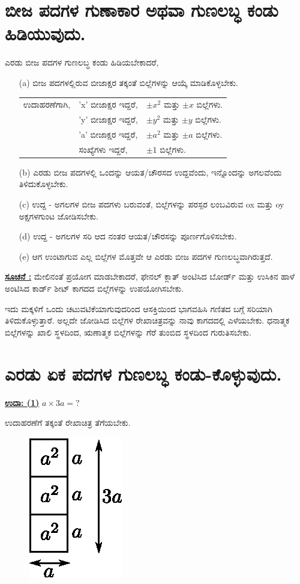 \section*{ಬೀಜ ಪದಗಳ ಗುಣಾಕಾರ ಅಥವಾ ಗುಣಲಬ್ಧ ಕಂಡು ಹಿಡಿಯುವುದು.}

ಎರಡು ಬೀಜ ಪದಗಳ ಗುಣಲಬ್ಧ ಕಂಡು ಹಿಡಿಯಬೇಕಾದರೆ,
\begin{itemize}
\item [(a)] ಬೀಜ ಪದಗಳಲ್ಲಿರುವ ಬೀಜಾಕ್ಷರ ತಕ್ಕಂತೆ ಬಿಲ್ಲೆಗಳನ್ನು ಆಯ್ಕೆ ಮಾಡಿಕೊಳ್ಳಬೇಕು.

\begin{tabular}{lll}
ಉದಾಹರಣೆಗಾಗಿ, & 'x' ಬೀಜಾಕ್ಷರ ಇದ್ದರೆ, & $\pm x^2$ ಮತ್ತು $\pm x$ ಬಿಲ್ಲೆಗಳು.\\
& 'y' ಬೀಜಾಕ್ಷರ ಇದ್ದರೆ, & $\pm y^2$ ಮತ್ತು $\pm y$ ಬಿಲ್ಲೆಗಳು.\\
& 'a' ಬೀಜಾಕ್ಷರ ಇದ್ದರೆ, & $\pm a^2$ ಮತ್ತು $\pm a$ ಬಿಲ್ಲೆಗಳು.\\
& ಸಂಖ್ಯೆಗಳು ಇದ್ದರೆ, & $\pm 1$ ಬಿಲ್ಲೆಗಳು.  
\end{tabular}
\item [(b)] ಎರಡು ಬೀಜ ಪದಗಳಲ್ಲಿ ಒಂದನ್ನು ಆಯತ/ಚೌರಸದ ಉದ್ದವೆಂದು, ಇನ್ನೊಂದನ್ನು ಅಗಲವೆಂದು ತಿಳಿದುಕೊಳ್ಳಬೇಕು. 
\item [(c)] ಉದ್ದ - ಅಗಲಗಳ ಬೀಜ ಪದಗಳು ಬರುವಂತೆ, ಬಿಲ್ಲೆಗಳನ್ನು ಪರಸ್ಪರ ಲಂಬವಿರುವ ox ಮತ್ತು oy ಅಕ್ಷಗಳಗುಂಟ ಜೋಡಿಸಬೇಕು. 
\item [(d)] ಉದ್ದ - ಅಗಲಗಳ ಸರಿ ಆದ ನಂತರ ಆಯತ/ಚೌರಸನ್ನು ಪೂರ್ಣಗೊಳಿಸಬೇಕು. 
\item [(e)] ಆಗ ಉಂಟಾಗುವ ಎಲ್ಲ ಬಿಲ್ಲೆಗಳ ಮೊತ್ತವೇ ಆ ಎರಡು ಬೀಜ ಪದಗಳ ಗುಣಲಬ್ಧ\break ವಾಗಿರುತ್ತದೆ.
\end{itemize}

\medskip
\noindent
{\textbf{\underline{ಸೂಚನೆ :}}} ಮೇಲಿನಂತೆ ಪ್ರಯೋಗ ಮಾಡಬೇಕಾದರೆ, ಫೇನಲ್ ಕ್ಲಾತ್ ಅಂಟಿಸಿದ ಬೋರ್ಡ್ ಮತ್ತು ಉಸಿಕಿನ ಹಾಳೆ ಅಂಟಿಸಿದ ಕಾರ್ಡ್ ಶೀಟ್ ಕಾಗದದ ಬಿಲ್ಲೆಗಳನ್ನು ಉಪಯೋಗಿಸ\-ಬೇಕು. 

ಇದು ಮಕ್ಕಳಿಗೆ ಒಂದು ಚಟುವಟಿಕೆಯಾಗುವುದರಿಂದ ಆಸಕ್ತಿಯಿಂದ ಭಾಗವಹಿಸಿ ಗಣಿತದ ಬಗ್ಗೆ ಸರಿಯಾಗಿ ತಿಳಿದುಕೊಳ್ಳುತ್ತಾರೆ. ಅಲ್ಲದೇ ಜೋಡಿಸಿದ ಬಿಲ್ಲೆಗಳ ರೇಖಾಚಿತ್ರವನ್ನು ನಾವು ಕಾಗದದಲ್ಲಿ ಎಳೆಯಬೇಕು. ಧನಾತ್ಮಕ ಬಿಲ್ಲೆಗಳನ್ನು ಖಾಲಿ ಸ್ಥಳದಿಂದ, ಋಣಾತ್ಮಕ ಬಿಲ್ಲೆಗಳನ್ನು ಗೆರೆ ತುಂಬಿದ ಸ್ಥಳದಿಂದ ಗುರುತಿಸಬೇಕು.

\section*{ಎರಡು ಏಕ ಪದಗಳ ಗುಣಲಬ್ಧ ಕಂಡು-ಕೊಳ್ಳುವುದು.}

\noindent
{\textbf{\underline{ಉದಾ: (1)}}} $a \times 3a = ?$

ಉದಾಹರಣೆಗೆ ತಕ್ಕಂತೆ ರೇಖಾಚಿತ್ರ ತೆಗೆಯಬೇಕು.
\begin{figure}[H]
\centering
\includegraphics[scale=0.9]{src/figure/chap3/fig3-29a.eps}
\end{figure}

